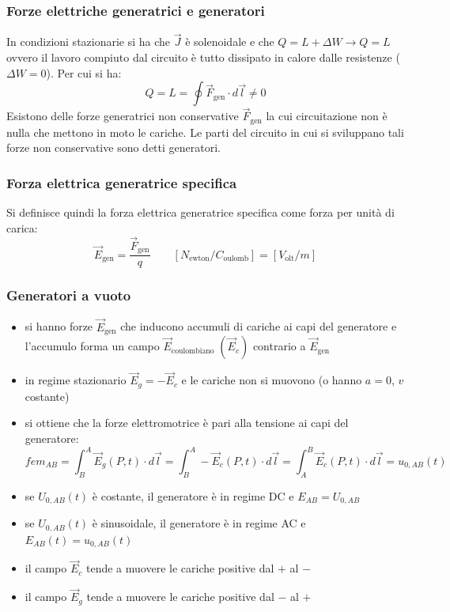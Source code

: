\documentclass[a4paper]{article}
\begin{document}
\subsubsection*{Forze elettriche generatrici e generatori}
In condizioni stazionarie si ha che \(\vec{J}\) è solenoidale e che \(Q = L + \Delta W \rightarrow Q = L\) ovvero il lavoro
compiuto dal circuito è tutto dissipato in calore dalle resistenze (\(\Delta W = 0\)). Per cui si ha:
\[Q = L = \oint \vec{F}_\text{gen} \cdot d \vec{l} \neq 0\]
Esistono delle forze generatrici non conservative \(\vec{F}_\text{gen}\) la cui circuitazione non è nulla che mettono in moto
le cariche. Le parti del circuito in cui si sviluppano tali forze non conservative sono detti generatori.

\subsubsection*{Forza elettrica generatrice specifica}
Si definisce quindi la forza elettrica generatrice specifica come forza per unità di carica:
\[\vec{E}_\text{gen} = \frac{\vec{F}_\text{gen}}{q} \qquad [N_\text{ewton} / C_\text{oulomb}] = [V_\text{olt} / m]\]

\subsubsection*{Generatori a vuoto}
\begin{itemize}
	\item si hanno forze \(\vec{E}_\text{gen}\) che inducono accumuli di cariche ai capi del generatore e l'accumulo forma
	un campo \(\vec{E}_\text{coulombiano} \; (\vec{E}_c)\) contrario a \(\vec{E}_\text{gen}\)
	\item in regime stazionario \(\vec{E}_g = -\vec{E}_c\) e le cariche non si muovono (o hanno \(a = 0\), \(v\) costante)
	\item si ottiene che la forze elettromotrice è pari alla tensione ai capi del generatore:
	\[fem_{AB} = \int_B^A \vec{E}_g(P,t) \cdot d\vec{l} = \int_B^A -\vec{E}_c(P,t) \cdot d\vec{l} = \int_A^B \vec{E}_c(P,t) \cdot d\vec{l} = u_{0,AB}(t)\]
	\item se \(U_{0,AB}(t)\) è costante, il generatore è in regime DC e \(E_{AB} = U_{0,AB}\)
	\item se \(U_{0,AB}(t)\) è sinusoidale, il generatore è in regime AC e \(E_{AB}(t) = u_{0,AB}(t)\)
	\item il campo \(\vec{E}_c\) tende a muovere le cariche positive dal \(+\) al \(-\)
	\item il campo \(\vec{E}_g\) tende a muovere le cariche positive dal \(-\) al \(+\)
\end{itemize}
\end{document}
